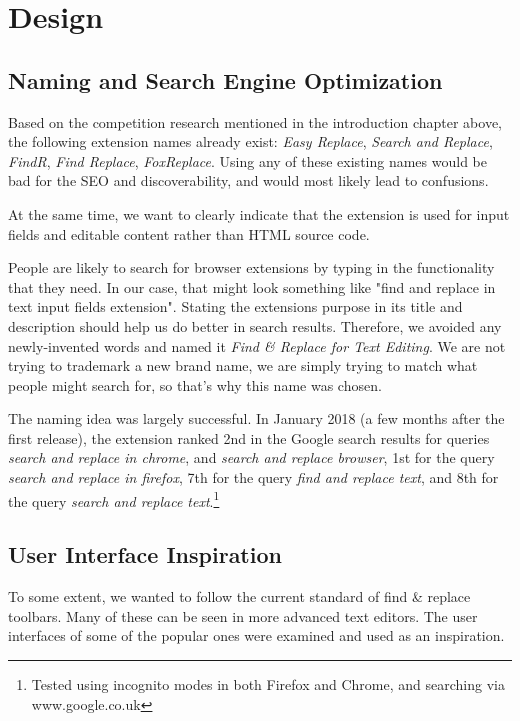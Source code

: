 \documentclass[bsc,frontabs,twoside,singlespacing,parskip,deptreport]{infthesis}
\begin{document}
\chapter{Design}

\section{Naming and Search Engine Optimization}
Based on the competition research mentioned in the introduction chapter above, the following extension names already exist: \textit{Easy Replace}, \textit{Search and Replace}, \textit{FindR}, \textit{Find Replace}, \textit{FoxReplace}. Using any of these existing names would be bad for the SEO and discoverability, and would most likely lead to confusions.

At the same time, we want to clearly indicate that the extension is used for input fields and editable content rather than HTML source code.

People are likely to search for browser extensions by typing in the functionality that they need. In our case, that might look something like "find and replace in text input fields extension". Stating the extensions purpose in its title and description should help us do better in search results. Therefore, we avoided any newly-invented words and named it \textit{Find \& Replace for Text Editing}. We are not trying to trademark a new brand name, we are simply trying to match what people might search for, so that's why this name was chosen.

The naming idea was largely successful. In January 2018 (a few months after the first release), the extension ranked 2nd in the Google search results for queries \textit{search and replace in chrome}, and \textit{search and replace browser}, 1st for the query \textit{search and replace in firefox}, 7th for the query \textit{find and replace text}, and 8th for the query \textit{search and replace text}.\footnote{Tested using incognito modes in both Firefox and Chrome, and searching via www.google.co.uk}

\section{User Interface Inspiration}
To some extent, we wanted to follow the current standard of find \& replace toolbars. Many of these can be seen in more advanced text editors. The user interfaces of some of the popular ones were examined and used as an inspiration.
\end{document}
